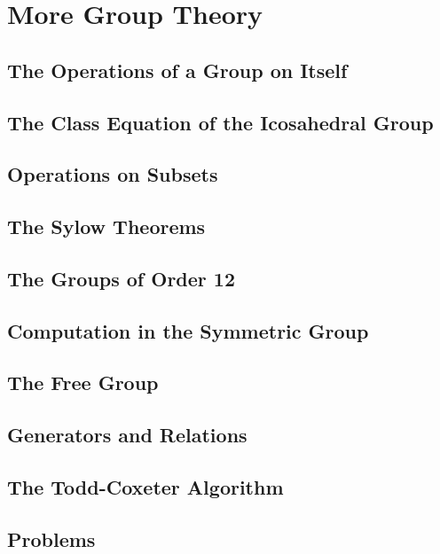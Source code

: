 \chapter{More Group Theory}
\section{The Operations of a Group on Itself}
\section{The Class Equation of the Icosahedral Group}
\section{Operations on Subsets}
\section{The Sylow Theorems}
\section{The Groups of Order 12}
\section{Computation in the Symmetric Group}
\section{The Free Group}
\section{Generators and Relations}
\section{The Todd-Coxeter Algorithm}
\section{Problems}